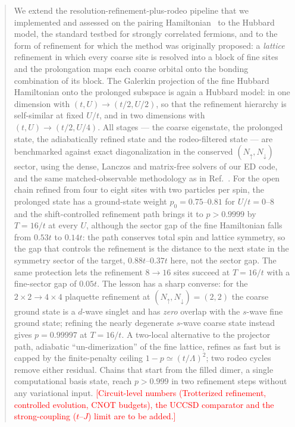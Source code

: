 \documentclass[
  aps,
  prc,
  reprint,
  superscriptaddress,
  floatfix,
  nofootinbib
]{revtex4-2}
\newcommand{\todo}[1]{\textcolor{red}{[#1]}}
\begin{document}
\begin{abstract}
We extend the resolution-refinement-plus-rodeo pipeline that we implemented
and assessed on the pairing Hamiltonian~\cite{EigenQPairing2026} to the
Hubbard model, the standard testbed for strongly correlated fermions, and to
the form of refinement for which the method was originally proposed: a
\emph{lattice} refinement in which every coarse site is resolved into a block
of fine sites and the prolongation maps each coarse orbital onto the bonding
combination of its block.  The Galerkin projection of the fine Hubbard
Hamiltonian onto the prolonged subspace is again a Hubbard model: in one
dimension with $(t,U)\to(t/2,U/2)$, so that the refinement hierarchy is
self-similar at fixed $U/t$, and in two dimensions with $(t,U)\to(t/2,U/4)$.
All stages --- the coarse eigenstate, the prolonged state, the adiabatically
refined state and the rodeo-filtered state --- are benchmarked against exact
diagonalization in the conserved $(N_\uparrow,N_\downarrow)$ sector, using
the dense, Lanczos and matrix-free solvers of our ED code, and the same
matched-observable methodology as in Ref.~\cite{EigenQPairing2026}.  For the
open chain refined from four to eight sites with two particles per spin, the
prolonged state has a ground-state weight $p_0=0.75$--$0.81$ for $U/t=0$--$8$
and the shift-controlled refinement path brings it to $p>0.9999$ by $T=16/t$
at every $U$, although the sector gap of the fine Hamiltonian falls from
$0.53t$ to $0.14t$: the path conserves total spin and lattice symmetry, so
the gap that controls the refinement is the distance to the next state in the
symmetry sector of the target, $0.88t$--$0.37t$ here, not the sector gap.
The same protection lets the refinement $8\to16$ sites succeed at
$T=16/t$ with a fine-sector gap of $0.05t$.  The lesson has a sharp
converse: for the $2\times2\to4\times4$ plaquette refinement at
$(N_\uparrow,N_\downarrow)=(2,2)$ the coarse ground state is a $d$-wave
singlet and has \emph{zero} overlap with the $s$-wave fine ground state;
refining the nearly degenerate $s$-wave coarse state instead gives
$p=0.99997$ at $T=16/t$.  A two-local alternative to the projector path,
adiabatic ``un-dimerization'' of the fine lattice, refines as fast but is
capped by the finite-penalty ceiling $1-p\simeq(t/\Lambda)^2$; two rodeo
cycles remove either residual.  Chains that start from the filled dimer, a
single computational basis state, reach $p>0.999$ in two refinement steps
without any variational input.  \todo{Circuit-level numbers (Trotterized
refinement, controlled evolution, CNOT budgets), the UCCSD comparator and
the strong-coupling ($t$--$J$) limit are to be added.}
\end{abstract}
\end{document}
